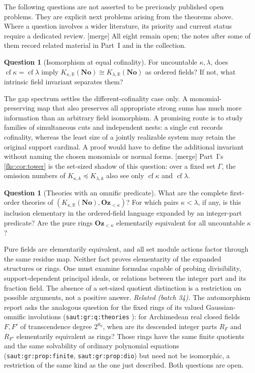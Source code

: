 \documentclass[11pt,letterpaper]{article}
\numberwithin{equation}{section}
\theoremstyle{definition}
\newtheorem{question}[theorem]{Question}
\theoremstyle{remark}
\newcommand{\R}{\mathbb R}
\newcommand{\No}{\mathbf{No}}
\newcommand{\cf}{\operatorname{cf}}
\newcommand{\mergetag}{\textup{\textsf{\small[merge]}}}%
\newcommand{\Oz}{\mathbf{Oz}}
\newcommand{\KN}[2]{K_{#1,#2}(\No)}%
\newcommand{\Ok}{\Oz_{<\kappa}}
\newcommand{\lbl}[1]{\nolinkurl{#1}}%
\begin{document}
The following questions are not asserted to be previously published open problems. They are explicit next problems arising from the theorems above. Where a question involves a wider literature, its priority and current status require a dedicated review. \mergetag{} All eight remain open; the notes after some of them record related material in Part~I and in the collection.

\begin{question}[Isomorphism at equal cofinality]\label{fkc:sb:q:equalcf}
For uncountable $\kappa,\lambda$, does $\cf\kappa=\cf\lambda$ imply $\KN\kappa\R\cong\KN\lambda\R$ as ordered fields? If not, what intrinsic field invariant separates them?
\end{question}
The gap spectrum settles the different-cofinality case only. A monomial-preserving map that also preserves all appropriate strong sums has much more information than an arbitrary field isomorphism. A promising route is to study families of simultaneous cuts and independent nests: a single cut records cofinality, whereas the least size of a jointly realizable system may retain the original support cardinal. A proof would have to define the additional invariant without naming the chosen monomials or normal forms. \mergetag{} Part~I's \cref{fkc:cor:tower} is the set-sized shadow of this question: over a fixed set $\Gamma$, the omission numbers of $K_{\kappa,k}\preccurlyeq K_{\lambda,k}$ also see only $\cf\kappa$ and $\cf\lambda$.

\begin{question}[Theories with an omnific predicate]\label{fkc:sb:q:omnific}
What are the complete first-order theories of $(\KN\kappa\R,\Ok)$? For which pairs $\kappa<\lambda$, if any, is this inclusion elementary in the ordered-field language expanded by an integer-part predicate? Are the pure rings $\Ok$ elementarily equivalent for all uncountable $\kappa$?
\end{question}
Pure fields are elementarily equivalent, and all set module actions factor through the same residue map. Neither fact proves elementarity of the expanded structures or rings. One must examine formulas capable of probing divisibility, support-dependent principal ideals, or relations between the integer part and its fraction field. The absence of a set-sized quotient distinction is a restriction on possible arguments, not a positive answer. \emph{Related (batch 34).} The automorphism report asks the analogous question for the fixed rings of its valued Gaussian-omnific involutions (\lbl{saut:gr:q:theories} \cite{CollSAUT}): for Archimedean real closed fields $F,F'$ of transcendence degree $2^{\aleph_0}$, when are its descended integer parts $R_F$ and $R_{F'}$ elementarily equivalent as rings? Those rings have the same finite quotients and the same solvability of ordinary polynomial equations (\lbl{saut:gr:prop:finite}, \lbl{saut:gr:prop:dio}) but need not be isomorphic, a restriction of the same kind as the one just described. Both questions are open.
\end{document}
